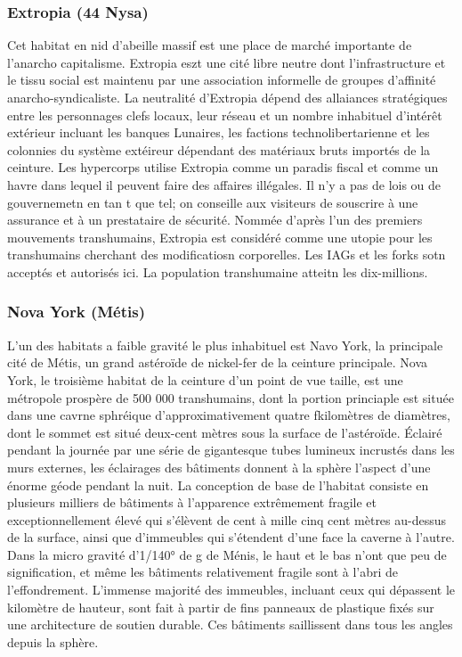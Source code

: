 \subsubsection{Extropia (44 Nysa)} \label{sec:extropia-44-nysa} 

Cet habitat en nid d'abeille massif est une place de marché importante de l'anarcho capitalisme. Extropia eszt une cité libre neutre dont l'infrastructure et le tissu social est maintenu par une association informelle de groupes d'affinité anarcho-syndicaliste. La neutralité d'Extropia dépend des allaiances stratégiques entre les personnages clefs locaux, leur réseau et un nombre inhabituel d'intérêt extérieur incluant les banques Lunaires, les factions technolibertarienne et les colonnies du système extéireur dépendant des matériaux bruts importés de la ceinture. Les hypercorps utilise Extropia comme un paradis fiscal et comme un havre dans lequel il peuvent faire des affaires illégales. Il n'y a pas de lois ou de gouvernemetn en tan t que tel; on conseille aux visiteurs de souscrire à une assurance et à un prestataire de sécurité. Nommée d'après l'un des premiers mouvements transhumains, Extropia est considéré comme une utopie pour les transhumains cherchant des modificatiosn corporelles. Les IAGs et les forks sotn acceptés et autorisés ici. La population transhumaine atteitn les dix-millions. 

\subsubsection{Nova York (Métis)} \label{sec:nova-york-metis} 

L'un des habitats a faible gravité le plus inhabituel est Navo York, la principale cité de Métis, un grand astéroïde de nickel-fer de la ceinture principale. Nova York, le troisième habitat de la ceinture d'un point de vue taille, est une métropole prospère de 500 000 transhumains, dont la portion princiaple est située dans une cavrne sphréique d'approximativement quatre fkilomètres de diamètres, dont le  sommet est situé deux-cent mètres sous la surface de l'astéroïde. Éclairé pendant la journée par une série de gigantesque tubes lumineux incrustés dans les murs externes, les éclairages des bâtiments donnent à la sphère l'aspect d'une énorme géode pendant la nuit. La conception de base de l'habitat consiste en plusieurs milliers de bâtiments à l'apparence extrêmement fragile et exceptionnellement élevé qui s'élèvent de cent à mille cinq cent mètres au-dessus de la surface, ainsi que d'immeubles qui s'étendent d'une face la caverne à l'autre. Dans la micro gravité d'1/140° de g de Ménis, le haut et le bas n'ont que peu de signification, et même les bâtiments relativement fragile sont à l'abri de l'effondrement. L'immense majorité des immeubles, incluant ceux qui dépassent le kilomètre de hauteur, sont fait à partir de fins panneaux de plastique fixés sur une architecture de soutien durable. Ces bâtiments saillissent dans tous les angles depuis la sphère. 


